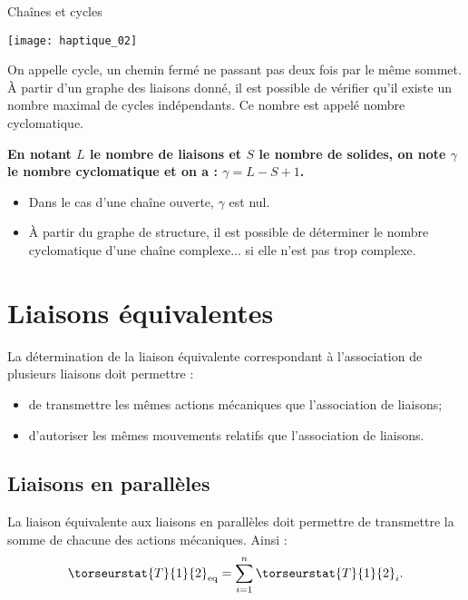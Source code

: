 \begin{defi}{Chaînes et cycles}
\begin{multicols}{3}
\begin{center}
\vspace{.5cm}

\texttt{[image: haptique\_02]}
\end{center}

\end{multicols}

On appelle cycle, un chemin fermé ne passant pas deux fois par le même sommet.
À partir d’un graphe des liaisons donné, il est possible de vérifier qu’il existe un nombre
maximal de cycles indépendants. Ce nombre est appelé nombre cyclomatique. 

\textbf{En notant $L$ le nombre de liaisons et $S$ le nombre de solides, on note $\gamma$ le nombre cyclomatique et on a : $\gamma = L - S + 1$.}
\end{defi}

\begin{rem}
\begin{itemize}
\item Dans le cas d'une chaîne ouverte, $\gamma$ est nul. 
\item À partir du graphe de structure, il est possible de déterminer le nombre cyclomatique d'une chaîne complexe... si elle n'est pas trop complexe.
\end{itemize}
\end{rem}

\section{Liaisons équivalentes}
\begin{obj}
La détermination de la liaison équivalente correspondant à l'association de plusieurs liaisons doit permettre : 
\begin{itemize}
\item de transmettre les mêmes actions mécaniques que l'association de liaisons;
\item d'autoriser les mêmes mouvements relatifs que l'association de liaisons.
\end{itemize}
\end{obj}

\subsection{Liaisons en parallèles}
\begin{methode}
La liaison équivalente aux liaisons en parallèles doit permettre de transmettre la somme de chacune des actions mécaniques. Ainsi : 
$$
\torseurstat{T}{1}{2}_{\text{eq}} = \sum\limits_{i=1}^{n}\torseurstat{T}{1}{2}_{i}.
$$ 
\end{methode}

